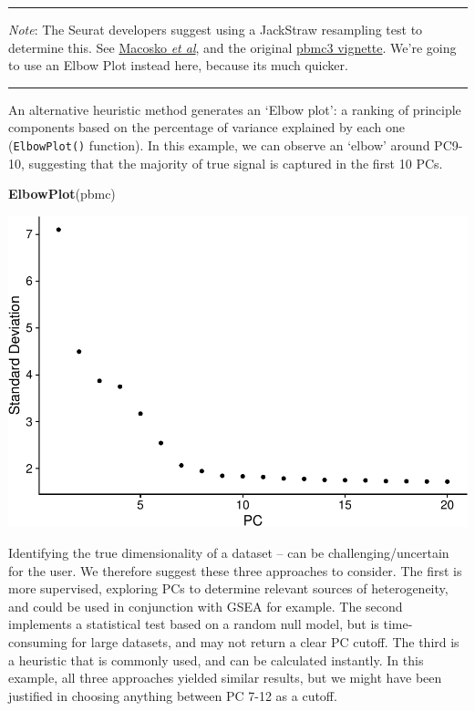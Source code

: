 \documentclass[
]{book}
\newenvironment{Shaded}{\begin{snugshade}}{\end{snugshade}}
\newcommand{\FunctionTok}[1]{\textcolor[rgb]{0.13,0.29,0.53}{\textbf{#1}}}
\newcommand{\NormalTok}[1]{#1}
\begin{document}
\begin{center}\rule{0.5\linewidth}{0.5pt}\end{center}

\emph{Note}: The Seurat developers suggest using a JackStraw resampling test to determine this. See \href{http://www.cell.com/abstract/S0092-8674(15)00549-8}{Macosko \emph{et al}}, and the original \href{https://satijalab.org/seurat/articles/pbmc3k_tutorial.html\#determine-the-dimensionality-of-the-dataset-1}{pbmc3 vignette}. We're going to use an Elbow Plot instead here, because its much quicker.

\begin{center}\rule{0.5\linewidth}{0.5pt}\end{center}

An alternative heuristic method generates an `Elbow plot': a ranking of principle components based on the percentage of variance explained by each one (\texttt{ElbowPlot()} function). In this example, we can observe an `elbow' around PC9-10, suggesting that the majority of true signal is captured in the first 10 PCs.

\begin{Shaded}
\begin{Highlighting}[]
\FunctionTok{ElbowPlot}\NormalTok{(pbmc)}
\end{Highlighting}
\end{Shaded}

\includegraphics{scRNAseqInR_Doco_files/figure-latex/elbow_plot-1.pdf}

Identifying the true dimensionality of a dataset -- can be challenging/uncertain for the user. We therefore suggest these three approaches to consider. The first is more supervised, exploring PCs to determine relevant sources of heterogeneity, and could be used in conjunction with GSEA for example. The second implements a statistical test based on a random null model, but is time-consuming for large datasets, and may not return a clear PC cutoff. The third is a heuristic that is commonly used, and can be calculated instantly. In this example, all three approaches yielded similar results, but we might have been justified in choosing anything between PC 7-12 as a cutoff.
\end{document}
